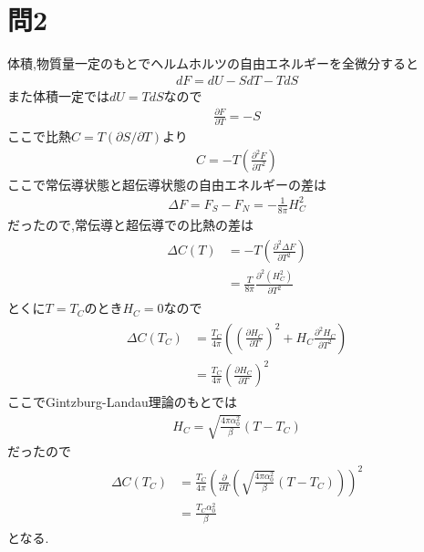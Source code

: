 \documentclass[uplatex,a4j,11pt,dvipdfmx]{jsarticle}
\begin{document}
\section*{問2}
体積,物質量一定のもとでヘルムホルツの自由エネルギーを全微分すると
\begin{align}
  dF=dU-SdT-TdS
\end{align}
また体積一定では$dU=TdS$なので
\begin{align}
  \frac{\partial F}{\partial T}=-S
\end{align}
ここで比熱$C=T(\partial S/\partial T)$より
\begin{align}
  C=-T\left(\frac{\partial^2 F}{\partial T^2}\right)
\end{align}
ここで常伝導状態と超伝導状態の自由エネルギーの差は
\begin{align}
  \Delta F=F_S-F_N=-\frac{1}{8\pi}H_C^2
\end{align}
だったので,常伝導と超伝導での比熱の差は
\begin{align}
  \begin{split}
    \Delta C(T)&=-T\left(\frac{\partial^2\Delta F}{\partial T^2}\right)\\
    &=\frac{T}{8\pi}\frac{\partial^2 (H_C^2)}{\partial T^2}
  \end{split}
\end{align}
とくに$T=T_C$のとき$H_C=0$なので
\begin{align}
  \begin{split}
    \Delta C(T_C)&=\frac{T_C}{4\pi}\left(\left(\frac{\partial H_C}{\partial T}\right)^2+H_C\frac{\partial^2H_C}{\partial T^2}\right)\\
    &=\frac{T_C}{4\pi}\left(\frac{\partial H_C}{\partial T}\right)^2
  \end{split}
\end{align}
ここでGintzburg-Landau理論のもとでは
\begin{align}
  H_C=\sqrt{\frac{4\pi\alpha_0^2}{\beta}}(T-T_C)
\end{align}
だったので
\begin{align}
  \begin{split}
    \Delta C(T_C)&=\frac{T_C}{4\pi}\left(\frac{\partial}{\partial T}\left(\sqrt{\frac{4\pi\alpha_0^2}{\beta}}(T-T_C)\right)\right)^2\\
    &=\frac{T_C\alpha_0^2}{\beta}
  \end{split}
\end{align}
となる.
\end{document}
